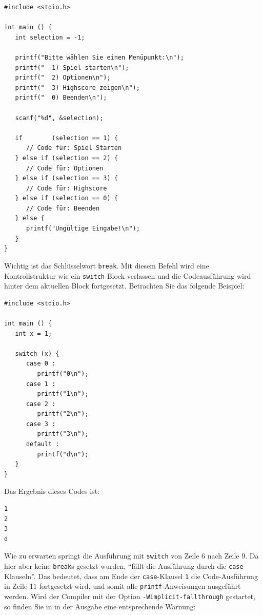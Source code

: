 \begin{codebox}
\begin{verbatim}
#include <stdio.h>

int main () {
   int selection = -1;
   
   printf("Bitte wählen Sie einen Menüpunkt:\n");
   printf("  1) Spiel starten\n");
   printf("  2) Optionen\n");
   printf("  3) Highscore zeigen\n");
   printf("  0) Beenden\n");
   
   scanf("%d", &selection);
   
   if        (selection == 1) {
      // Code für: Spiel Starten
   } else if (selection == 2) {
      // Code für: Optionen
   } else if (selection == 3) {
      // Code für: Highscore
   } else if (selection == 0) {
      // Code für: Beenden
   } else {
      printf("Ungültige Eingabe!\n");
   }
}
\end{verbatim}
\end{codebox}

Wichtig ist das Schlüsselwort \texttt{break}. Mit diesem Befehl wird eine Kontrollstruktur wie ein \texttt{switch}-Block verlassen und die Codeausführung wird hinter dem aktuellen Block fortgesetzt. Betrachten Sie das folgende Beispiel:

\begin{warnbox}[Beispiel: \texttt{switch} ohne \texttt{break}, leftupper=7mm]
\begin{verbatim}
#include <stdio.h>

int main () {
   int x = 1;
   
   switch (x) {
      case 0 :
         printf("0\n");
      case 1 :
         printf("1\n");
      case 2 :
         printf("2\n");
      case 3 :
         printf("3\n");
      default :
         printf("d\n");
   }
}
\end{verbatim}
\end{warnbox}

Das Ergebnis dieses Codes ist:
\begin{cmdbox}
\begin{verbatim}
1
2
3
d
\end{verbatim}
\end{cmdbox}

Wie zu erwarten springt die Ausführung mit \texttt{switch} von Zeile 6 nach Zeile 9. Da hier aber keine \texttt{break}s gesetzt wurden, \enquote{fällt die Ausführung durch die \texttt{case}-Klauseln}. Das bedeutet, dass am Ende der \texttt{case}-Klausel \texttt{1} die Code-Ausführung in Zeile 11 fortgesetzt wird, und somit alle \texttt{printf}-Anweisungen ausgeführt werden. Wird der Compiler mit der Option \texttt{-Wimplicit-fallthrough} gestartet, so finden Sie in in der Ausgabe eine entsprechende Warnung:

